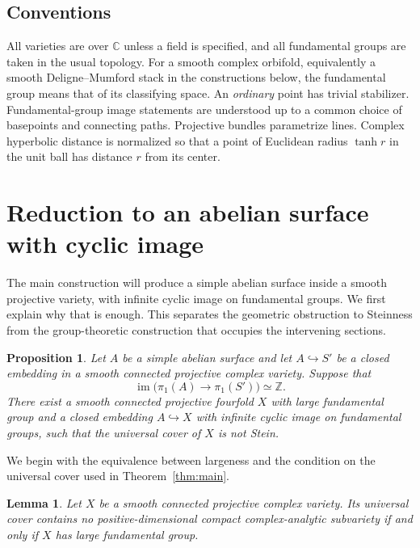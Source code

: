 \documentclass[11pt,reqno]{amsart}
\numberwithin{equation}{section}
\newtheorem{lemma}[theorem]{Lemma}
\newtheorem{proposition}[theorem]{Proposition}
\theoremstyle{definition}
\theoremstyle{remark}
\begin{document}
\subsection{Conventions}
All varieties are over $\mathbb C$ unless a field is specified, and all
fundamental groups are taken in the usual topology.  For a smooth
complex orbifold, equivalently a smooth Deligne--Mumford stack in the
constructions below, the fundamental group means that of its
classifying space.  An \emph{ordinary} point has trivial stabilizer.
Fundamental-group image statements are understood up to a common
choice of basepoints and connecting paths.  Projective bundles
parametrize lines.  Complex hyperbolic distance is normalized so that
a point of Euclidean radius $\tanh r$ in the unit ball has distance
$r$ from its center.

\section{Reduction to an abelian surface with cyclic image}
\label{sec:reduction}

The main construction will produce a simple abelian surface inside a
smooth projective variety, with infinite cyclic image on fundamental
groups.  We first explain why that is enough.  This separates the
geometric obstruction to Steinness from the group-theoretic construction
that occupies the intervening sections.

\begin{proposition}\label{prop:large-reduction}
Let $A$ be a simple abelian surface and let $A\hookrightarrow S'$ be a
closed embedding in a smooth connected projective complex variety.
Suppose that
\[
 \operatorname{im}\bigl(\pi_1(A)\longrightarrow\pi_1(S')\bigr)\simeq\mathbb Z.
\]
There exist a smooth connected projective fourfold $X$ with large
fundamental group and a closed embedding $A\hookrightarrow X$ with
infinite cyclic image on fundamental groups, such that the universal
cover of $X$ is not Stein.
\end{proposition}

We begin with the equivalence between largeness and the condition on
the universal cover used in Theorem~\ref{thm:main}.

\begin{lemma}\label{red:compact-criterion}
Let $X$ be a smooth connected projective complex variety.  Its universal
cover contains no positive-dimensional compact complex-analytic
subvariety if and only if $X$ has large fundamental group.
\end{lemma}
\end{document}
